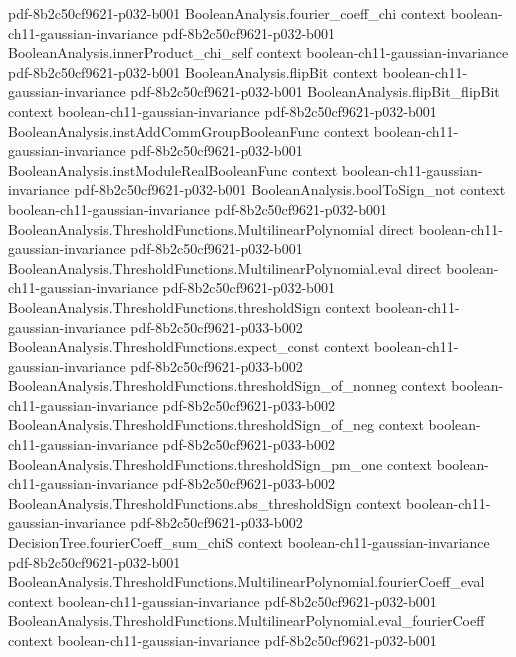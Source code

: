 \begin{theorem}
  {pdf-8b2c50cf9621-p032-b001}
\proofstep
  {BooleanAnalysis.fourier_coeff_chi}
  {context}
  {boolean-ch11-gaussian-invariance}
  {pdf-8b2c50cf9621-p032-b001}
\proofstep
  {BooleanAnalysis.innerProduct_chi_self}
  {context}
  {boolean-ch11-gaussian-invariance}
  {pdf-8b2c50cf9621-p032-b001}
\proofstep
  {BooleanAnalysis.flipBit}
  {context}
  {boolean-ch11-gaussian-invariance}
  {pdf-8b2c50cf9621-p032-b001}
\proofstep
  {BooleanAnalysis.flipBit_flipBit}
  {context}
  {boolean-ch11-gaussian-invariance}
  {pdf-8b2c50cf9621-p032-b001}
\proofstep
  {BooleanAnalysis.instAddCommGroupBooleanFunc}
  {context}
  {boolean-ch11-gaussian-invariance}
  {pdf-8b2c50cf9621-p032-b001}
\proofstep
  {BooleanAnalysis.instModuleRealBooleanFunc}
  {context}
  {boolean-ch11-gaussian-invariance}
  {pdf-8b2c50cf9621-p032-b001}
\proofstep
  {BooleanAnalysis.boolToSign_not}
  {context}
  {boolean-ch11-gaussian-invariance}
  {pdf-8b2c50cf9621-p032-b001}
\proofstep
  {BooleanAnalysis.ThresholdFunctions.MultilinearPolynomial}
  {direct}
  {boolean-ch11-gaussian-invariance}
  {pdf-8b2c50cf9621-p032-b001}
\proofstep
  {BooleanAnalysis.ThresholdFunctions.MultilinearPolynomial.eval}
  {direct}
  {boolean-ch11-gaussian-invariance}
  {pdf-8b2c50cf9621-p032-b001}
\proofstep
  {BooleanAnalysis.ThresholdFunctions.thresholdSign}
  {context}
  {boolean-ch11-gaussian-invariance}
  {pdf-8b2c50cf9621-p033-b002}
\proofstep
  {BooleanAnalysis.ThresholdFunctions.expect_const}
  {context}
  {boolean-ch11-gaussian-invariance}
  {pdf-8b2c50cf9621-p033-b002}
\proofstep
  {BooleanAnalysis.ThresholdFunctions.thresholdSign_of_nonneg}
  {context}
  {boolean-ch11-gaussian-invariance}
  {pdf-8b2c50cf9621-p033-b002}
\proofstep
  {BooleanAnalysis.ThresholdFunctions.thresholdSign_of_neg}
  {context}
  {boolean-ch11-gaussian-invariance}
  {pdf-8b2c50cf9621-p033-b002}
\proofstep
  {BooleanAnalysis.ThresholdFunctions.thresholdSign_pm_one}
  {context}
  {boolean-ch11-gaussian-invariance}
  {pdf-8b2c50cf9621-p033-b002}
\proofstep
  {BooleanAnalysis.ThresholdFunctions.abs_thresholdSign}
  {context}
  {boolean-ch11-gaussian-invariance}
  {pdf-8b2c50cf9621-p033-b002}
\proofstep
  {DecisionTree.fourierCoeff_sum_chiS}
  {context}
  {boolean-ch11-gaussian-invariance}
  {pdf-8b2c50cf9621-p032-b001}
\proofstep
  {BooleanAnalysis.ThresholdFunctions.MultilinearPolynomial.fourierCoeff_eval}
  {context}
  {boolean-ch11-gaussian-invariance}
  {pdf-8b2c50cf9621-p032-b001}
\proofstep
  {BooleanAnalysis.ThresholdFunctions.MultilinearPolynomial.eval_fourierCoeff}
  {context}
  {boolean-ch11-gaussian-invariance}
  {pdf-8b2c50cf9621-p032-b001}

\end{theorem}
